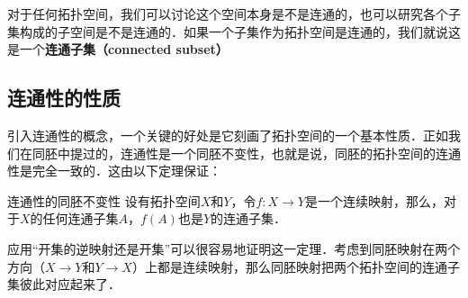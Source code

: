 对于任何拓扑空间，我们可以讨论这个空间本身是不是连通的，也可以研究各个子集构成的子空间是不是连通的．如果一个子集作为拓扑空间是连通的，我们就说这是一个\textbf{连通子集（connected subset）}

\subsection{连通性的性质}

引入连通性的概念，一个关键的好处是它刻画了拓扑空间的一个基本性质．正如我们在同胚中提过的，连通性是一个同胚不变性，也就是说，同胚的拓扑空间的连通性是完全一致的．这由以下定理保证：

\begin{theorem}{连通性的同胚不变性}\label{Topo3_the1}
设有拓扑空间$X$和$Y$，令$f:X\rightarrow Y$是一个连续映射，那么，对于$X$的任何连通子集$A$，$f(A)$也是$Y$的连通子集．
\end{theorem}

应用“开集的逆映射还是开集”可以很容易地证明这一定理．考虑到同胚映射在两个方向（$X\rightarrow Y$和$Y\rightarrow X$）上都是连续映射，那么同胚映射把两个拓扑空间的连通子集彼此对应起来了．

